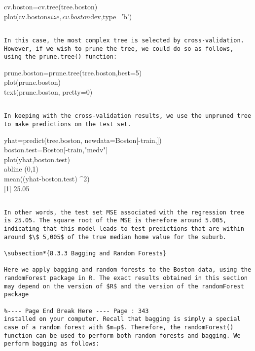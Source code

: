 \documentclass[10pt]{article}
\begin{document}
\begin{displayquote}
cv.boston=cv.tree(tree.boston)\\
plot(cv.boston$size,cv.boston$dev,type='b')
\end{displayquote}

\begin{verbatim}

In this case, the most complex tree is selected by cross-validation. However, if we wish to prune the tree, we could do so as follows, using the prune.tree() function:
\end{verbatim}

\begin{displayquote}
prune.boston=prune.tree(tree.boston,best=5)\\
plot(prune.boston)\\
text(prune.boston, pretty=0)
\end{displayquote}

\begin{verbatim}

In keeping with the cross-validation results, we use the unpruned tree to make predictions on the test set.
\end{verbatim}

\begin{displayquote}
yhat=predict(tree.boston, newdata=Boston[-train,])\\[0pt]
boston.test=Boston[-train,"medv"]\\
plot(yhat,boston.test)\\
abline (0,1)\\
mean((yhat-boston.test) \^{}2)\\[0pt]
[1] 25.05
\end{displayquote}

\begin{verbatim}

In other words, the test set MSE associated with the regression tree is 25.05. The square root of the MSE is therefore around 5.005, indicating that this model leads to test predictions that are within around $\$ 5,005$ of the true median home value for the suburb.

\subsection*{8.3.3 Bagging and Random Forests}

Here we apply bagging and random forests to the Boston data, using the randomForest package in R. The exact results obtained in this section may depend on the version of $R$ and the version of the randomForest package

%---- Page End Break Here ---- Page : 343
installed on your computer. Recall that bagging is simply a special case of a random forest with $m=p$. Therefore, the randomForest() function can be used to perform both random forests and bagging. We perform bagging as follows:
\end{verbatim}
\end{document}
